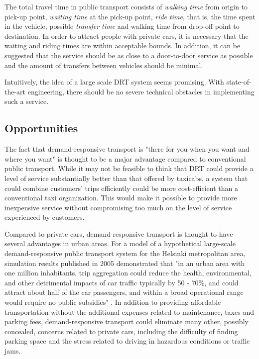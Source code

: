 \documentclass[dissertation,draft*]{aaltoseries}
\begin{document}
The total travel time in public transport consists of
\emph{walking time} from origin to pick-up point, \emph{waiting time} at
the pick-up point, \emph{ride time}, that is, the time spent in the
vehicle, possible \emph{transfer time} and walking time from 
drop-off point to destination. In order %
to attract people with private cars, it is necessary that the waiting and 
riding times are within acceptable bounds. In addition, it can be suggested that
the service should be as close to a door-to-door service as possible and the amount of
transfers between vehicles should be minimal. 

Intuitively, the idea of a large scale DRT system seems promising.
With state-of-the-art engineering, there should be no severe technical obstacles
in implementing such a service.


\subsection{Opportunities}
The fact that demand-responsive transport is "there for you when you want
and where you want" is thought to be a major advantage compared to conventional 
public transport. While it may not be feasible to think that DRT could provide
a level of service substantially better than that offered by taxicabs, a system that could combine customers'
trips efficiently could be more cost-efficient than a conventional taxi organization.
This would make it possible to provide more inexpensive service without compromising
too much on the level of service experienced by customers.

Compared to private cars, demand-responsive transport is thought to have several advantages in urban areas.
For a model of a hypothetical large-scale demand-responsive public transport system for the Helsinki 
metropolitan area, simulation results published in 2005 demonstrated that "in an urban area with one 
million inhabitants, trip aggregation could reduce the health, environmental, and other detrimental 
impacts of car traffic typically by 50 - 70\%, and could attract about half of the car 
passengers, and within a broad operational range would require no public subsidies" \cite{tuomisto}. 
In addition to providing affordable transportation without the additional expenses related 
to maintenance, taxes and parking fees, 
demand-responsive transport could eliminate many other, possibly concealed, concerns related to private cars, 
including the difficulty of finding parking space and the stress related to
driving in hazardous conditions or traffic jams.
\end{document}
